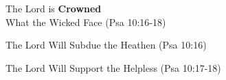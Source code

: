 \begin{compactenum}[I.]
    \item The Lord is \textbf{Crowned} \\
    What the Wicked Face  (Psa 10:16-18)
    \begin{compactenum}[A.]
    	\item The Lord Will Subdue the Heathen  (Psa 10:16)
    	\item The Lord Will Support the Helpless  (Psa 10:17-18)
    \end{compactenum}

\end{compactenum}